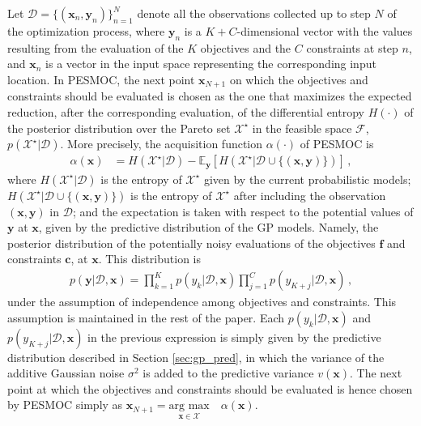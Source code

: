 \documentclass[review,preprint,12pt]{elsarticle}
\begin{document}
Let $\mathcal{D} = \{(\mathbf{x}_n, \mathbf{y}_n)\}_{n=1}^N$ denote all the observations collected up
to step $N$ of the optimization process, where $\mathbf{y}_n$ is a $K + C$-dimensional vector with the 
values resulting from the evaluation of the $K$ objectives and the $C$ constraints at step $n$, and $\mathbf{x}_n$ is a vector 
in the input space representing the corresponding input location. In PESMOC, the next
point $\mathbf{x}_{N+1}$ on which the objectives and constraints should be evaluated  
is chosen as the one that maximizes the expected reduction, after the corresponding evaluation, of
the differential entropy $H(\cdot)$ of the posterior distribution over the Pareto 
set $\mathcal{X}^\star$ in the feasible space $\mathcal{F}$, 
$p(\mathcal{X}^\star|\mathcal{D})$. More precisely, the acquisition function $\alpha(\cdot)$ of 
PESMOC is
\begin{align}
\alpha(\mathbf{x}) & = H(\mathcal{X}^{\star}|\mathcal{D}) - \mathbb{E}_{\textbf{y}} 
	[H(\mathcal{X}^{\star}|\mathcal{D} \cup \{(\textbf{x},\textbf{y})\})]
\label{eq:es}
\,,
\end{align}
where $H(\mathcal{X}^{\star}|\mathcal{D})$ is the entropy of $\mathcal{X}^\star$ given by the current probabilistic
models; $H(\mathcal{X}^{\star}|\mathcal{D} \cup \{(\textbf{x},\textbf{y})\})$ is the entropy of $\mathcal{X}^\star$ after
including the observation $(\textbf{x},\textbf{y})$ in $\mathcal{D}$; and the expectation is taken 
with respect to the potential values of $\mathbf{y}$ at $\mathbf{x}$, given by the predictive 
distribution of the GP models. Namely, the posterior distribution of the potentially 
noisy evaluations of the objectives $\textbf{f}$ and constraints $\textbf{c}$, at $\mathbf{x}$. 
This distribution is
\begin{align}
p(\textbf{y}|\mathcal{D},\textbf{x}) = \prod_{k=1}^{K}p(y_k|\mathcal{D},\textbf{x}) \prod_{j=1}^C p(y_{K+j}|\mathcal{D},\mathbf{x})\,,
\label{eq:prods}
\end{align} 
under the assumption of independence among objectives and constraints. 
This assumption is maintained in the rest of the paper.
Each $p(y_k|\mathcal{D},\textbf{x})$ and 
$p(y_{K+j}|\mathcal{D},\textbf{x})$ in the previous expression is simply 
given by the predictive distribution described in Section \ref{sec:gp_pred}, in which the variance of the additive 
Gaussian noise $\sigma^2$ is added to the predictive variance $v(\mathbf{x})$. The next point at which 
the objectives and constraints should be evaluated is hence chosen by PESMOC simply as 
$\mathbf{x}_{N+1} = \underset{\mathbf{x}\in\mathcal{X}}{\text{arg max}}\quad \alpha(\mathbf{x})$. 
\end{document}
